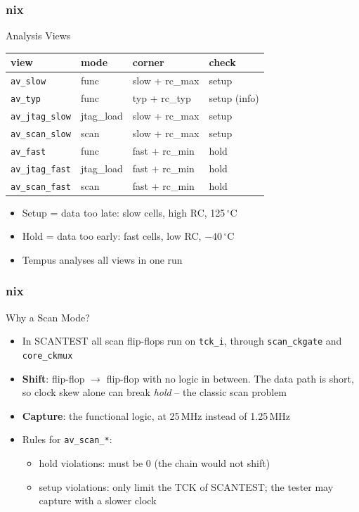 \documentclass{beamer}
\newcommand{\astitle}{nix}
\newcommand{\assubtitle}{nix}
\newcommand{\cmd}[1]{\texttt{#1}}
\begin{document}
\renewcommand{\assubtitle}{Analysis Views}
\begin{frame}
\frametitle{\astitle}
\begin{block}{\assubtitle}
  \footnotesize
  \begin{tabularx}{\linewidth}{@{}lllY@{}}
    \textbf{view} & \textbf{mode} & \textbf{corner} & \textbf{check}\\\hline
    \cmd{av\_slow}      & func      & slow + rc\_max & setup\\
    \cmd{av\_typ}       & func      & typ + rc\_typ  & setup (info)\\
    \cmd{av\_jtag\_slow} & jtag\_load & slow + rc\_max & setup\\
    \cmd{av\_scan\_slow} & scan      & slow + rc\_max & setup\\
    \cmd{av\_fast}      & func      & fast + rc\_min & hold\\
    \cmd{av\_jtag\_fast} & jtag\_load & fast + rc\_min & hold\\
    \cmd{av\_scan\_fast} & scan      & fast + rc\_min & hold\\
  \end{tabularx}
  \vspace{4pt}
  \begin{itemize}
    \item Setup = data too late: slow cells, high RC, 125\,$^\circ$C
    \item Hold = data too early: fast cells, low RC, $-40$\,$^\circ$C
    \item Tempus analyses all views in one run
  \end{itemize}
\end{block}
\end{frame}

\renewcommand{\assubtitle}{Why a Scan Mode?}
\begin{frame}
\frametitle{\astitle}
\begin{block}{\assubtitle}
  \begin{itemize}
    \item In SCANTEST all scan flip-flops run on \cmd{tck\_i}, through
      \cmd{scan\_ckgate} and \cmd{core\_ckmux}
    \item \textbf{Shift}: flip-flop $\rightarrow$ flip-flop with no logic
      in between. The data path is short, so clock skew alone can break
      \emph{hold} -- the classic scan problem
    \item \textbf{Capture}: the functional logic, at 25\,MHz instead of
      1.25\,MHz
    \item Rules for \cmd{av\_scan\_*}:
    \begin{itemize}
      \item hold violations: must be 0 (the chain would not shift)
      \item setup violations: only limit the TCK of SCANTEST; the tester
        may capture with a slower clock
    \end{itemize}
  \end{itemize}
\end{block}
\end{frame}
\end{document}
